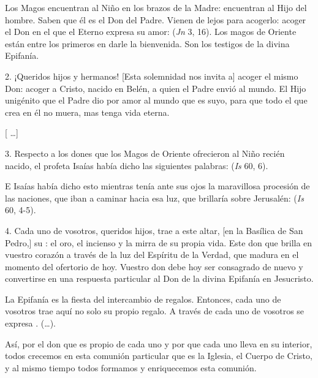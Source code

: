 \begin{body}
	Los Magos encuentran al Niño en los brazos de la Madre: encuentran al Hijo del hombre. Saben que él es el Don del Padre. Vienen de lejos para acogerlo: acoger el Don en el que el Eterno expresa su amor:  (\emph{Jn} 3, 16). Los magos de Oriente están entre los primeros en darle la bienvenida. Son los testigos de la divina Epifanía.

	2. ¡Queridos hijos y hermanos! {[}Esta solemnidad nos invita a{]} acoger el mismo Don: acoger a Cristo, nacido en Belén, a quien el Padre envió al mundo. El Hijo unigénito que el Padre dio por amor al mundo que es suyo, para que todo el que crea en él no muera, mas tenga vida eterna.

	{[} \ldots{}{]}

	3. Respecto a los dones que los Magos de Oriente ofrecieron al Niño recién nacido, el profeta Isaías había dicho las siguientes palabras:  (\emph{Is} 60, 6).

	E Isaías había dicho esto mientras tenía ante sus ojos la maravillosa procesión de las naciones, que iban a caminar hacia esa luz, que brillaría sobre Jerusalén:  (\emph{Is} 60, 4-5).

	4. Cada uno de vosotros, queridos hijos, trae a este altar, {[}en la Basílica de San Pedro,{]} su : el oro, el incienso y la mirra de su propia vida. Este don que brilla en vuestro corazón a través de la luz del Espíritu de la Verdad, que madura en el momento del ofertorio de hoy. Vuestro don debe hoy ser consagrado de nuevo y convertirse en una respuesta particular al Don de la divina Epifanía en Jesucristo.

	La Epifanía es la fiesta del intercambio de regalos. Entonces, cada uno de vosotros trae aquí no solo su propio regalo. A través de cada uno de vosotros se expresa . (\ldots{}).

	Así, por el don que es propio de cada uno y por  que cada uno lleva en su interior, todos crecemos en esta comunión particular que es la Iglesia, el Cuerpo de Cristo, y al mismo tiempo todos formamos y enriquecemos esta comunión.


\end{body}
